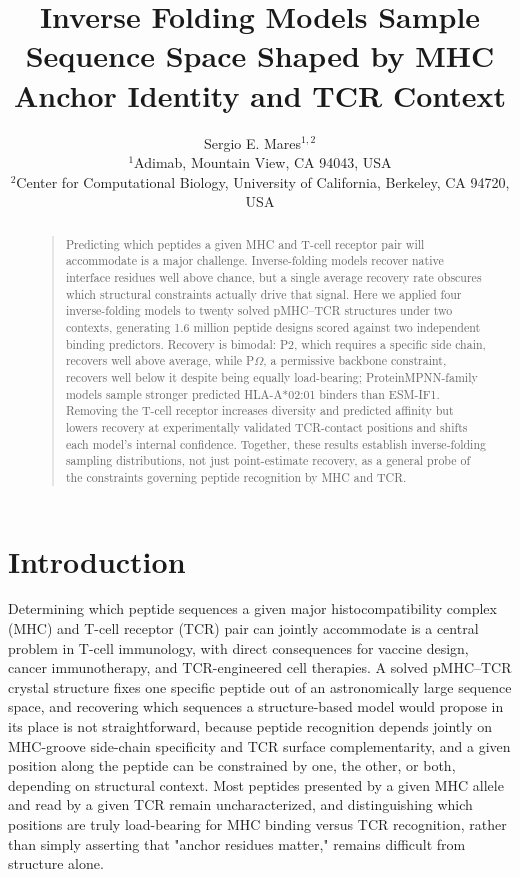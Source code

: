 \documentclass[letterpaper]{article}
\begin{document}
\title{Inverse Folding Models Sample Sequence Space Shaped by MHC Anchor Identity and TCR Context}
\author{Sergio E. Mares$^{1,2}$ \\
{\small $^1$Adimab, Mountain View, CA 94043, USA} \\
{\small $^2$Center for Computational Biology, University of California, Berkeley, CA 94720, USA}}
\nocopyright
\maketitle

\begin{abstract}
\begin{quote}
Predicting which peptides a given MHC and T-cell receptor pair will accommodate is a major challenge.
Inverse-folding models recover native interface residues well above chance, but a single average
recovery rate obscures which structural constraints actually drive that signal. Here we applied four
inverse-folding models to twenty solved pMHC--TCR structures under two contexts, generating 1.6 million
peptide designs scored against two independent binding predictors. Recovery is bimodal: P2, which
requires a specific side chain, recovers well above average, while P$\Omega$, a permissive backbone
constraint, recovers well below it despite being equally load-bearing; ProteinMPNN-family models sample
stronger predicted HLA-A*02:01 binders than ESM-IF1. Removing the T-cell receptor increases diversity and
predicted affinity but lowers recovery at experimentally validated TCR-contact positions and shifts each
model's internal confidence. Together, these results establish inverse-folding sampling distributions,
not just point-estimate recovery, as a general probe of the constraints governing peptide recognition by
MHC and TCR.
\end{quote}
\end{abstract}

\section{Introduction}

Determining which peptide sequences a given major histocompatibility complex (MHC) and T-cell receptor
(TCR) pair can jointly accommodate is a central problem in T-cell immunology, with direct consequences
for vaccine design, cancer immunotherapy, and TCR-engineered cell therapies. A solved pMHC--TCR crystal
structure fixes one specific peptide out of an astronomically large sequence space, and recovering which
sequences a structure-based model would propose in its place is not straightforward, because peptide
recognition depends jointly on MHC-groove side-chain specificity and TCR surface complementarity, and a given position along the
peptide can be constrained by one, the other, or both, depending on structural context. Most peptides
presented by a given MHC allele and read by a given TCR remain uncharacterized, and distinguishing which
positions are truly load-bearing for MHC binding versus TCR recognition, rather than simply asserting
that "anchor residues matter," remains difficult from structure alone.
\end{document}
